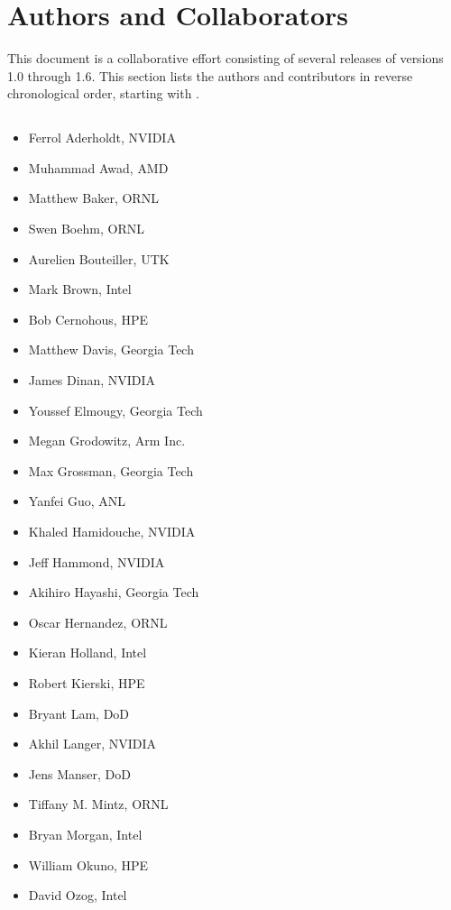 \section*{Authors and Collaborators}
This document is a collaborative effort consisting of several releases of \openshmem versions 1.0 through 1.6. This section lists the authors and contributors in reverse chronological order, starting with .

\subsection*{}
\begin{multicols}{2}
\begin{itemize}
\setlength\itemsep{0.1em}
\item Ferrol Aderholdt, NVIDIA
\item Muhammad Awad, \ac{AMD}
\item Matthew Baker, \ac{ORNL}
\item Swen Boehm, \ac{ORNL}
\item Aurelien Bouteiller, \ac{UTK}
\item Mark Brown, Intel
\item Bob Cernohous, \ac{HPE}
\item Matthew Davis, Georgia Tech
\item James Dinan\footnotemark[1], NVIDIA
\item Youssef Elmougy, Georgia Tech
\item Megan Grodowitz, Arm Inc.
\item Max Grossman, Georgia Tech
\item Yanfei Guo, \ac{ANL}
\item Khaled Hamidouche, NVIDIA
\item Jeff Hammond, NVIDIA
\item Akihiro Hayashi, Georgia Tech
\item Oscar Hernandez, \ac{ORNL}
\item Kieran Holland, Intel
\item Robert Kierski, \ac{HPE}
\item Bryant Lam, \ac{DoD}
\item Akhil Langer, NVIDIA
\item Jens Manser, \ac{DoD}
\item Tiffany M. Mintz, \ac{ORNL}
\item Bryan Morgan, Intel
\item William Okuno\footnotemark[2], \ac{HPE}
\item David Ozog\footnotemark[5], Intel

\end{itemize}
\end{multicols}
